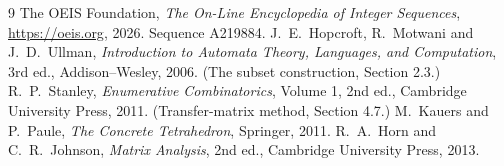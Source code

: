 \documentclass[11pt,a4paper]{article}
\theoremstyle{plain}
\theoremstyle{definition}
\begin{document}
\begin{thebibliography}{9}
 The OEIS Foundation, \emph{The On-Line Encyclopedia of Integer
Sequences}, \url{https://oeis.org}, 2026. Sequence A219884.
 J.~E.~Hopcroft, R.~Motwani and J.~D.~Ullman, \emph{Introduction to Automata
Theory, Languages, and Computation}, 3rd ed., Addison--Wesley, 2006. (The subset
construction, Section 2.3.)
 R.~P.~Stanley, \emph{Enumerative Combinatorics}, Volume 1, 2nd ed.,
Cambridge University Press, 2011. (Transfer-matrix method, Section 4.7.)
 M.~Kauers and P.~Paule, \emph{The Concrete Tetrahedron}, Springer, 2011.
 R.~A.~Horn and C.~R.~Johnson, \emph{Matrix Analysis}, 2nd ed., Cambridge
University Press, 2013.
\end{thebibliography}
\end{document}

